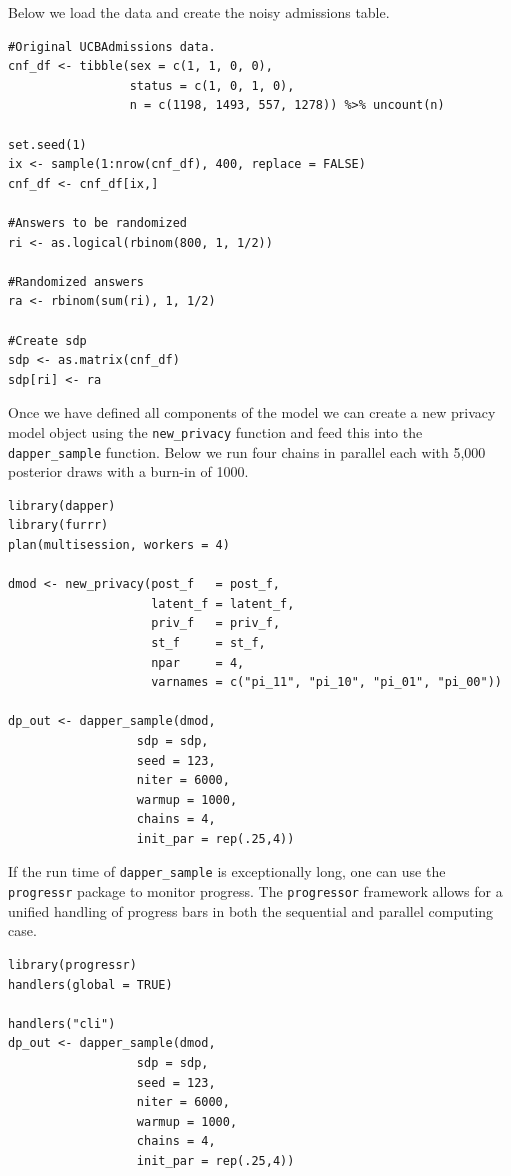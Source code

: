 Below we load the data and create the noisy admissions table.

\begin{verbatim}
#Original UCBAdmissions data.
cnf_df <- tibble(sex = c(1, 1, 0, 0),
                 status = c(1, 0, 1, 0),
                 n = c(1198, 1493, 557, 1278)) %>% uncount(n)

set.seed(1) 
ix <- sample(1:nrow(cnf_df), 400, replace = FALSE)
cnf_df <- cnf_df[ix,]

#Answers to be randomized
ri <- as.logical(rbinom(800, 1, 1/2)) 

#Randomized answers
ra <- rbinom(sum(ri), 1, 1/2)

#Create sdp
sdp <- as.matrix(cnf_df)
sdp[ri] <- ra
\end{verbatim}

Once we have defined all components of the model we can
create a new privacy model object using the \texttt{new\_privacy} function and
feed this into the \texttt{dapper\_sample} function. Below we run four chains
in parallel each with 5,000 posterior draws with a burn-in of 1000.

\begin{verbatim}
library(dapper)
library(furrr)
plan(multisession, workers = 4)

dmod <- new_privacy(post_f   = post_f,
                    latent_f = latent_f,
                    priv_f   = priv_f,
                    st_f     = st_f,
                    npar     = 4,
                    varnames = c("pi_11", "pi_10", "pi_01", "pi_00"))
                  
dp_out <- dapper_sample(dmod,
                  sdp = sdp,
                  seed = 123,
                  niter = 6000,
                  warmup = 1000,
                  chains = 4,
                  init_par = rep(.25,4))
\end{verbatim}

If the run time of \texttt{dapper\_sample} is exceptionally long, one can
use the \texttt{progressr} package to monitor progress. The \texttt{progressor} framework
allows for a unified handling of progress bars in both the sequential and
parallel computing case.

\begin{verbatim}
library(progressr)
handlers(global = TRUE)

handlers("cli")
dp_out <- dapper_sample(dmod,
                  sdp = sdp,
                  seed = 123,
                  niter = 6000,
                  warmup = 1000,
                  chains = 4,
                  init_par = rep(.25,4))
\end{verbatim}

